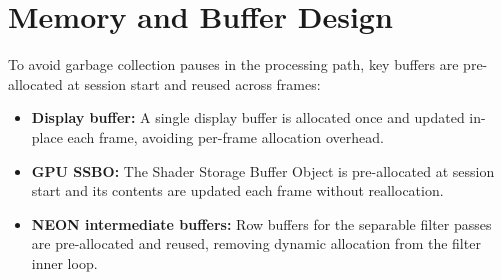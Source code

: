 \documentclass[12pt, a4paper]{article}
\begin{document}
\section{Memory and Buffer Design}

To avoid garbage collection pauses in the processing path, key buffers are pre-allocated at
session start and reused across frames:
\begin{itemize}
    \item \textbf{Display buffer:} A single display buffer is allocated once and updated
          in-place each frame, avoiding per-frame allocation overhead.
    \item \textbf{GPU SSBO:} The Shader Storage Buffer Object is pre-allocated at session start
          and its contents are updated each frame without reallocation.
    \item \textbf{NEON intermediate buffers:} Row buffers for the separable filter passes are
          pre-allocated and reused, removing dynamic allocation from the filter inner loop.
\end{itemize}
\end{document}
